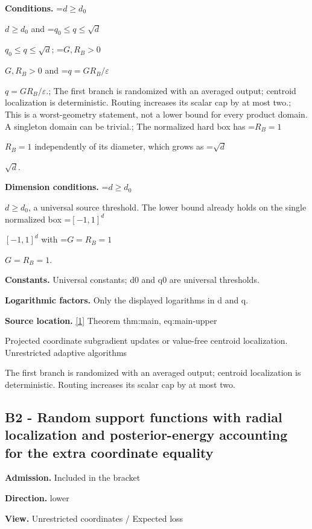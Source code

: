\documentclass[10pt,a4paper]{article}
\newcommand{\AtlasMath}[1]{\par\begingroup\centering\setbox0=\hbox{$\displaystyle #1$}\ifdim\wd0>1.4\linewidth\typeout{ATLAS WIDE FORMULA: \the\wd0}\fi\ifdim\wd0>\linewidth\resizebox{\linewidth}{!}{\box0}\else\box0\fi\par\endgroup}
\newcommand{\AtlasInlineMath}[1]{\begingroup\setbox0=\hbox{$#1$}\ifdim\wd0>.4\linewidth\endgroup\AtlasMath{#1}\else\endgroup$#1$\fi}
\begin{document}
\textbf{Conditions.} \AtlasInlineMath{d\ge d_0} and \AtlasInlineMath{q_0\le q\le\sqrt d}; \AtlasInlineMath{G,R_B>0} and \AtlasInlineMath{q=GR_B/\varepsilon}.; The first branch is randomized with an averaged output; centroid localization is deterministic. Routing increases its scalar cap by at most two.; This is a worst-geometry statement, not a lower bound for every product domain. A singleton domain can be trivial.; The normalized hard box has \AtlasInlineMath{R_B=1} independently of its diameter, which grows as \AtlasInlineMath{\sqrt d}.



\textbf{Dimension conditions.} \AtlasInlineMath{d\ge d_0}, a universal source threshold. The lower bound already holds on the single normalized box \AtlasInlineMath{[-1,1]^d} with \AtlasInlineMath{G=R_B=1}.



\textbf{Constants.} Universal constants; d0 and q0 are universal thresholds.



\textbf{Logarithmic factors.} Only the displayed logarithms in d and q.



\textbf{Source location.} \href{https://github.com/WU-Wendao/Colombo/blob/main/colombo_sensorium/Complexity_altas/data/sources/colombo/U03/manuscript.pdf}{[1]} Theorem thm:main, eq:main-upper



Projected coordinate subgradient updates or value-free centroid localization. Unrestricted adaptive algorithms



The first branch is randomized with an averaged output; centroid localization is deterministic. Routing increases its scalar cap by at most two.



\subsection{B2 - Random support functions with radial localization and posterior-energy accounting for the extra coordinate equality}


\textbf{Admission.} Included in the bracket



\textbf{Direction.} lower



\textbf{View.} Unrestricted coordinates / Expected loss
\end{document}
